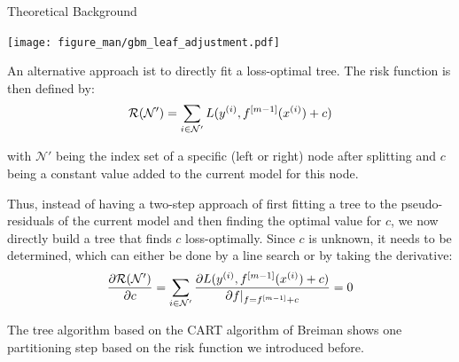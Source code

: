 \begin{vbframe}{Theoretical Background}
\begin{small}
\begin{center}

\texttt{[image: figure\_man/gbm\_leaf\_adjustment.pdf]}

\end{center}

\end{small}

\framebreak

An alternative approach ist to directly fit a loss-optimal tree.
The risk function is then defined by:
$$
\mathcal{R}(\mathcal{N}') = \sum_{i \in \mathcal{N}'} L(y^{(i)}, f^{[m-1]}(x^{(i)}) + c)
$$

with $\mathcal{N}'$ being the index set of a specific (left or right) node after splitting and $c$ being a constant value added to the current model for this node.

Thus, instead of having a two-step approach of first fitting a tree to the pseudo-residuals of the current model and then finding the optimal value for $c$, we now directly build a tree that finds $c$ loss-optimally. Since $c$ is unknown, it needs to be determined, which can either be done by a line search or by taking the derivative:
$$
\frac{\partial{\mathcal{R}(\mathcal{N}')}}{\partial c} = \sum_{i \in \mathcal{N}'} \frac{\partial{L(y^{(i)}, f^{[m-1]}(x^{(i)}) + c)}}{\partial f \rvert_{f = f^{[m-1]} + c}} = 0
$$
\framebreak


The tree algorithm based on the CART algorithm of Breiman shows one partitioning step based on the risk function we introduced before. 
\end{vbframe}



